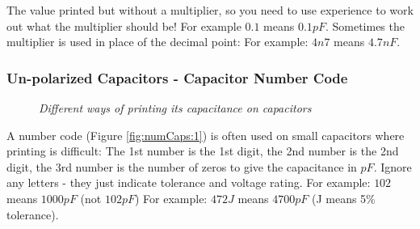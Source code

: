 			The value printed but without a multiplier, so you need to use experience to work out what the multiplier should be! For example $0.1$ means $0.1pF$. Sometimes the multiplier is used in place of the decimal point: For example: $4n7$ means $4.7nF$.
		
		\subsubsection{Un-polarized Capacitors - Capacitor Number Code}			
			\begin{figure}[ht]
				\centering 
				\hfill
				\caption{\textit{Different ways of printing its capacitance on capacitors}}
			\end{figure}
		
			A number code (Figure \ref{fig:numCaps:1}) is often used on small capacitors where printing is difficult: The 1st number is the 1st digit, the 2nd number is the 2nd digit, the 3rd number is the number of zeros to give the capacitance in $pF$. Ignore any letters - they just indicate tolerance and voltage rating. For example: $102$ means $1000pF$ (not $102pF$) For example: $472J$ means $4700pF$ (J means 5\% tolerance).
			
